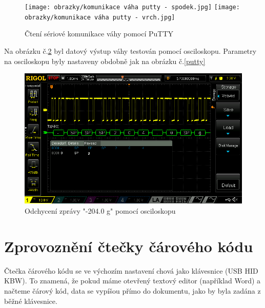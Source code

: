 \begin{figure}[H]
    \begin{center}
        \texttt{[image: obrazky/komunikace váha putty - spodek.jpg]}
        \texttt{[image: obrazky/komunikace váha putty - vrch.jpg]}
    \end{center}
    \caption{Čtení sériové komunikace váhy pomocí PuTTY}
    \label{puttyyyy}
\end{figure}

Na obrázku č.\ref{osc} byl datový výstup váhy testován pomocí osciloskopu. Parametry na osciloskopu byly nastaveny obdobně jak na obrázku č.\ref{putty}

\begin{figure}[H]
    \begin{center}
        \includegraphics[scale=0.5]{obrazky/DS1Z_QuickPrint6.png}
    \end{center}
    \caption{Odchycení zprávy "-204.0 g" pomocí osciloskopu}
    \label{osc}
\end{figure}

\section{Zprovoznění čtečky čárového kódu}
\label{zprovozeni_ctecky}

Čtečka čárového kódu se ve výchozím nastavení chová jako klávesnice (USB HID KBW). To znamená, že pokud máme otevřený textový editor (například Word) a načteme čárový kód, data se vypíšou přímo do dokumentu, jako by byla zadána z běžné klávesnice.

